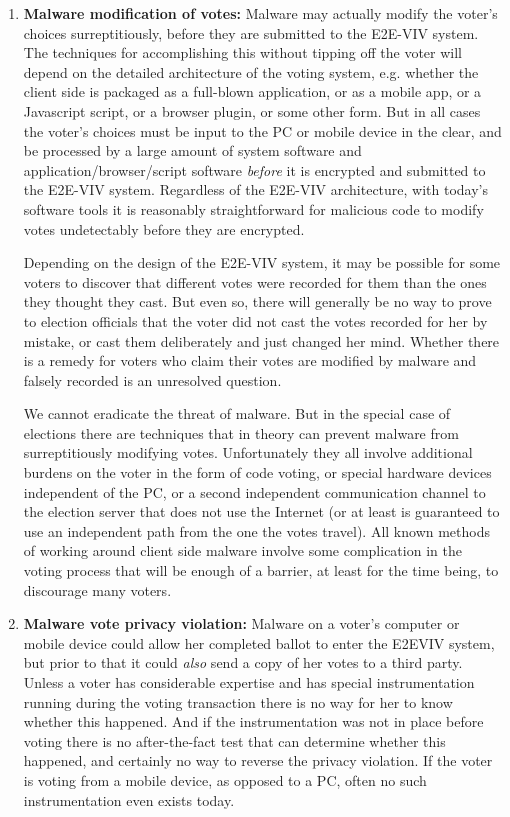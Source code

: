 \begin{enumerate}[label={\roman*})]
\item \textbf{Malware modification of votes:} Malware may actually
  modify the voter’s choices surreptitiously, before they are
  submitted to the E2E-VIV system. The techniques for accomplishing
  this without tipping off the voter will depend on the detailed
  architecture of the voting system, e.g. whether the client side is
  packaged as a full-blown application, or as a mobile app, or a
  Javascript script, or a browser plugin, or some other form. But in
  all cases the voter’s choices must be input to the PC or mobile
  device in the clear, and be processed by a large amount of system
  software and application/browser/script software \emph{before} it is
  encrypted and submitted to the E2E-VIV system. Regardless of the
  E2E-VIV architecture, with today’s software tools it is reasonably
  straightforward for malicious code to modify votes undetectably
  before they are encrypted.

  Depending on the design of the E2E-VIV system, it may be possible
  for some voters to discover that different votes were recorded for
  them than the ones they thought they cast. But even so, there will
  generally be no way to prove to election officials that the voter
  did not cast the votes recorded for her by mistake, or cast them
  deliberately and just changed her mind. Whether there is a remedy
  for voters who claim their votes are modified by malware and falsely
  recorded is an unresolved question.

  We cannot eradicate the threat of malware. But in the special case
  of elections there are techniques that in theory can prevent malware
  from surreptitiously modifying votes. Unfortunately they all involve
  additional burdens on the voter in the form of code voting, or
  special hardware devices independent of the PC, or a second
  independent communication channel to the election server that does
  not use the Internet (or at least is guaranteed to use an
  independent path from the one the votes travel). All known methods
  of working around client side malware involve some complication in
  the voting process that will be enough of a barrier, at least for
  the time being, to discourage many voters.

\item \textbf{Malware vote privacy violation:} Malware on a voter’s
  computer or mobile device could allow her completed ballot to enter
  the E2EVIV system, but prior to that it could \emph{also} send a
  copy of her votes to a third party. Unless a voter has considerable
  expertise and has special instrumentation running during the voting
  transaction there is no way for her to know whether this
  happened. And if the instrumentation was not in place before voting
  there is no after-the-fact test that can determine whether this
  happened, and certainly no way to reverse the privacy violation. If
  the voter is voting from a mobile device, as opposed to a PC, often
  no such instrumentation even exists today.


\end{enumerate}
